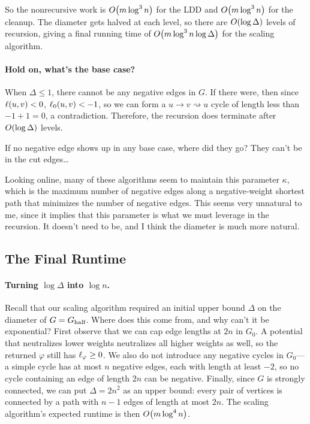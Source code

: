 \documentclass[12pt]{article}
\begin{document}
So the nonrecursive work is $\bigO{m\log^3 n}$ for the LDD and $\bigO{m\log^3
  n}$ for the cleanup. The diameter gets halved at each level, so there are
$\bigO{\log \Delta}$ levels of recursion, giving a final running time of
$\bigO{m\log^3 n \log \Delta}$ for the scaling algorithm.

\paragraph{Hold on, what's the base case?}

When $\Delta \leq 1$, there cannot be any negative edges in $G$. If there were,
then since $\len{u, v} < 0$, $\len_0{u, v} < -1$, so we can form a
$u \to v \rightsquigarrow u$ cycle of length less than $-1 + 1 = 0$, a
contradiction. Therefore, the recursion does terminate after $\bigO{\log
  \Delta}$ levels.

\begin{nudge}
  If no negative edge shows up in any base case, where did they go? They can't
  be in the cut edges\dots
\end{nudge}

\begin{remark}
  Looking online, many of these algorithms seem to maintain this parameter
  $\kappa$, which is the maximum number of negative edges along a
  negative-weight shortest path that minimizes the number of negative edges.
  This seems very unnatural to me, since it implies that this parameter is what
  we must leverage in the recursion. It doesn't need to be, and I think the
  diameter is much more natural.
\end{remark}

\subsection{The Final Runtime}

\paragraph{Turning $\log \Delta$ into $\log n$.}

Recall that our scaling algorithm required an initial upper bound $\Delta$ on
the diameter of $G = G_{\text{half}}$. Where does this come from, and why can't it be
exponential? First observe that we can cap edge lengths at $2n$ in $G_0$. A
potential that neutralizes lower weights neutralizes all higher weights as well,
so the returned $\varphi$ still has $\len_\varphi \geq 0$. We also do not
introduce any negative cycles in $G_0$---a simple cycle has at most $n$ negative
edges, each with length at least $-2$, so no cycle containing an edge of length
$2n$ can be negative. Finally, since $G$ is strongly connected, we can put
$\Delta = 2n^2$ as an upper bound: every pair of vertices is connected by a path
with $n - 1$ edges of length at most $2n$. The scaling algorithm's expected
runtime is then $\bigO{m\log^4 n}$.
\end{document}
